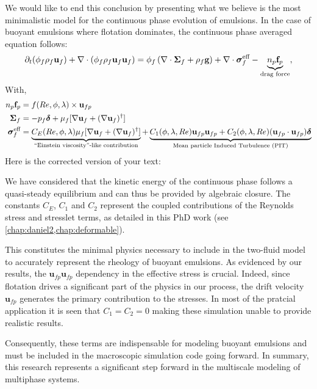 We would like to end this conclusion by presenting what we believe is the most minimalistic model for the continuous phase evolution of emulsions.
In the case of buoyant emulsions where flotation dominates, the continuous phase averaged equation follows: 
\begin{align}
    \partial_t (\phi_f\rho_f \textbf{u}_f)
    + \mathbf{\nabla}\cdot (\phi_f\rho_f \textbf{u}_f\textbf{u}_f)
    = \phi_f 
    \left(\mathbf{\nabla}\cdot \bm{\Sigma}_f
    + \rho_f \textbf{g}\right)
    + \mathbf{\nabla}\cdot  \bm{\sigma}_f^{\text{eff}}
    - \underbrace{n_p \textbf{f}_p}_\text{drag force},
\end{align}
With, 
\begin{align}
    n_p \textbf{f}_p  
    &= 
    f(Re,\phi, \lambda) \times \textbf{u}_{fp}\\
  \bm\Sigma_f &= - p_f \bm\delta + \mu_f [\mathbf{\nabla} \textbf{u}_f +  (\mathbf{\nabla} \textbf{u}_f)^\dagger ] \\
    \bm{\sigma}^{\text{eff}}_f 
    &= \underbrace{C_E(Re,\phi,\lambda) \mu_f [\mathbf{\nabla} \textbf{u}_f +  (\mathbf{\nabla} \textbf{u}_f)^\dagger ] }_\text{``Einstein viscosity''-like contribution}
    + 
    \underbrace{
      C_1(\phi,\lambda,Re)\textbf{u}_{fp}\textbf{u}_{fp}
    + C_2(\phi,\lambda,Re)(\textbf{u}_{fp}\cdot \textbf{u}_{fp})     \bm\delta}_\text{Mean particle Induced Turbulence (PIT)}
\end{align}
Here is the corrected version of your text:

We have considered that the kinetic energy of the continuous phase follows a quasi-steady equilibrium and can thus be provided by algebraic closure.
The constants $C_E$, $C_1$ and $C_2$ represent the coupled contributions of the Reynolds stress and stresslet terms, as detailed in this PhD work (see \ref{chap:daniel2,chap:deformable}).

This constitutes the minimal physics necessary to include in the two-fluid model to accurately represent the rheology of buoyant emulsions.
As evidenced by our results, the $\textbf{u}_{fp}\textbf{u}_{fp}$ dependency in the effective stress is crucial.
Indeed, since flotation drives a significant part of the physics in our process, the drift velocity $\textbf{u}_{fp}$ generates the primary contribution to the stresses.
In most of the pratcial application it is seen that $C_1 = C_2 = 0$ making these simulation unable to provide realistic results.

Consequently, these terms are indispensable for modeling buoyant emulsions and must be included in the macroscopic simulation code going forward.
In summary, this research represents a significant step forward in the multiscale modeling of multiphase systems.

